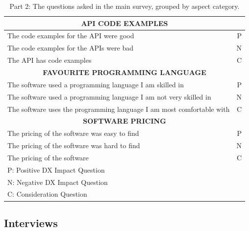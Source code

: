 \documentclass{article}
\begin{document}
\begin{table}[H]
\begin{tabularx}{\columnwidth}{X|r}
\multicolumn{2}{c}{\textbf{	API CODE EXAMPLES	}} \\ \hline
The code examples for the API were good	&	P		\\ \hline
The code examples for the APIs were bad	&	N		\\ \hline
The API has code examples	&	C		\\ \hline \hline
\multicolumn{2}{c}{\textbf{	FAVOURITE PROGRAMMING LANGUAGE	}} \\ \hline
The software used a programming language I am skilled in	&	P		\\ \hline
The software used a programming language I am not very skilled in	&	N		\\ \hline
The software uses the programming language I am most comfortable with	&	C		\\ \hline \hline
\multicolumn{2}{c}{\textbf{	SOFTWARE PRICING	}} \\ \hline
The pricing of the software was easy to find	&	P		\\ \hline
The pricing of the software was hard to find	&	N		\\ \hline
The pricing of the software	&	C		\\ \hline \hline
\multicolumn{2}{l}{P: Positive DX Impact Question} \\
\multicolumn{2}{l}{N: Negative DX Impact Question} \\
\multicolumn{2}{l}{C: Consideration Question}

\end{tabularx}
\caption{Part 2: The questions asked in the main survey, grouped by aspect category.}
\label{tab:allQPart2}
\end{table}

\subsection{Interviews}
\end{document}
